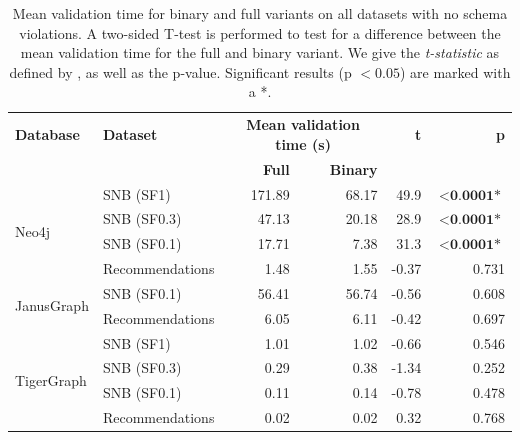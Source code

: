 \documentclass{report}
\theoremstyle{definition}
\begin{document}
\begin{table}[p]
  \centering
  \begin{tabular}{llrrrr}
    \hline
    \textbf{Database}           & \textbf{Dataset} & \multicolumn{2}{c}{\textbf{Mean validation time (s)}} & \textbf{t}      & \textbf{p}                      \\
                                &                  & \textbf{Full}                                         & \textbf{Binary} &            &                    \\
    \hline
    \multirow{4}{*}{Neo4j}      & SNB (SF1)        & 171.89                                                & 68.17           & 49.9       & $\mathbf{<}\textbf{0.0001*}$ \\
                                & SNB (SF0.3)      & 47.13                                                 & 20.18           & 28.9       & $\mathbf{<}\textbf{0.0001*}$ \\
                                & SNB (SF0.1)      & 17.71                                                 & 7.38            & 31.3       & $\mathbf{<}\textbf{0.0001*}$ \\
                                & Recommendations  & 1.48                                                  & 1.55            & -0.37      & 0.731              \\
    \hline
    \multirow{2}{*}{JanusGraph} & SNB (SF0.1)      & 56.41                                                 & 56.74           & -0.56      & 0.608              \\
                                & Recommendations  & 6.05                                                  & 6.11            & -0.42      & 0.697              \\
    \hline
    \multirow{4}{*}{TigerGraph} & SNB (SF1)        & 1.01                                                  & 1.02            & -0.66      & 0.546              \\
                                & SNB (SF0.3)      & 0.29                                                  & 0.38            & -1.34      & 0.252              \\
                                & SNB (SF0.1)      & 0.11                                                  & 0.14            & -0.78      & 0.478              \\
                                & Recommendations  & 0.02                                                  & 0.02            & 0.32       & 0.768              \\
    \hline
  \end{tabular}
  \caption[Mean validation time for binary and full variants]{Mean validation time for binary and full variants on all datasets with no schema violations. A two-sided T-test is performed to test for a difference between the mean validation time for the full and binary variant. We give the \emph{t-statistic} as defined by \citet{student1908probable}, as well as the p-value. Significant results (p $< 0.05$) are marked with a *.}
  \label{tab:results-variant}
\end{table}
\end{document}
